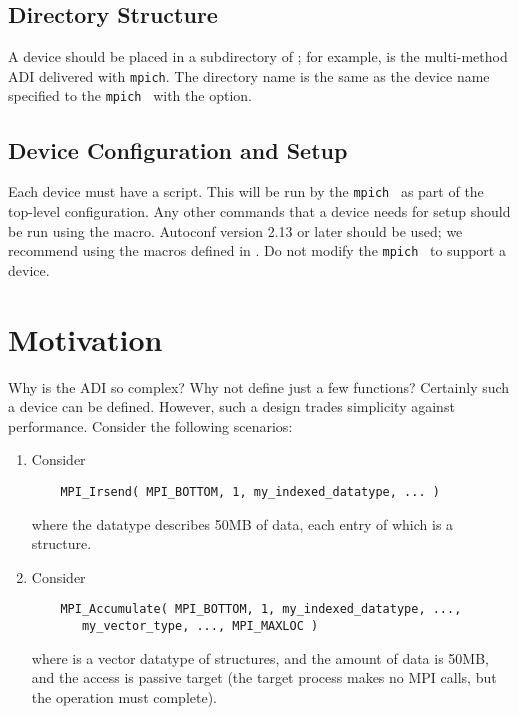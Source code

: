 \documentclass{article}
\newcommand{\mpich}{\texttt{mpich}}
\begin{document}
\subsection{Directory Structure}
\label{sec:adi3-dirs}
A device should be placed in a subdirectory of ;
for example,  is the multi-method ADI
delivered with \mpich.  The directory name is the same as the device
name specified to the \mpich\  with the
 option.

\subsection{Device Configuration and Setup}
\label{sec:adi3-setup}
Each device must have a  script.  This will be run by
the \mpich\  as part of the top-level configuration.
Any other commands that a device needs for setup should be run using
the   macro.  Autoconf version
2.13 or later should be used; we recommend using the macros defined in
.  
Do not modify the \mpich\  to support a device.


\section{Motivation}
\label{sec:motivation}

Why is the ADI so complex?  Why not define just a few functions?
Certainly such a device can be defined.  However, such a design trades
simplicity against performance.  
Consider the following scenarios:
\begin{enumerate}
\item Consider
\begin{verbatim}
    MPI_Irsend( MPI_BOTTOM, 1, my_indexed_datatype, ... )
\end{verbatim}
where the datatype describes 50MB of data, each entry of which is a
structure.
\item Consider
\begin{verbatim}
    MPI_Accumulate( MPI_BOTTOM, 1, my_indexed_datatype, ..., 
       my_vector_type, ..., MPI_MAXLOC )
\end{verbatim}
where  is
a vector datatype of structures, and the amount of data is 50MB, and
the access is passive target (the target process makes no MPI calls,
but the operation must complete).
\end{enumerate}
\end{document}
